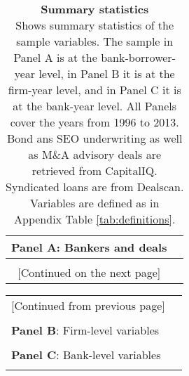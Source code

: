 

\singlespacing	


	
\begin{table}[H] \begin{center} 
		\caption{\textbf{Summary statistics} \\ Shows summary statistics of the sample variables. The sample in Panel A is at the bank-borrower-year level, in Panel B it is at the firm-year  level, and in Panel C it is at the bank-year level. All Panels cover the years from 1996 to 2013. Bond ans SEO underwriting as well as M\&A advisory deals are retrieved from CapitalIQ. Syndicated loans are from Dealscan.  Variables are defined as in Appendix Table \ref{tab:definitions}. }
		\label{tab:sumstat} 
	\begin{threeparttable} 
		\begin{tabular*}{\hsize} {@{\hskip\tabcolsep\extracolsep\fill}l*{7}{c}}
			\multicolumn{7}{l}{\textbf{Panel A}: Bankers and deals} \\
			\toprule 
		  
		 	\bottomrule \\ \multicolumn{7}{c}{[Continued on the next page]} 
		  \end{tabular*} 	\end{threeparttable}  \end{center} \end{table}
\newpage

\begin{table}[H] \begin{center} \begin{threeparttable} 
		\begin{tabular*}{\hsize} {@{\hskip\tabcolsep\extracolsep\fill}l*{7}{c}}
		 	 \multicolumn{7}{c}{[Continued from previous page]} \\ \\
		 	 \multicolumn{7}{l}{\textbf{Panel B}: Firm-level variables} \\
			\toprule 
		  
		 	\bottomrule \\
		 	\multicolumn{7}{l}{\textbf{Panel C}: Bank-level variables} \\
		 	\bottomrule \\
		 
		 \end{tabular*}
	\end{threeparttable} \end{center}
\end{table}
\clearpage \newpage


